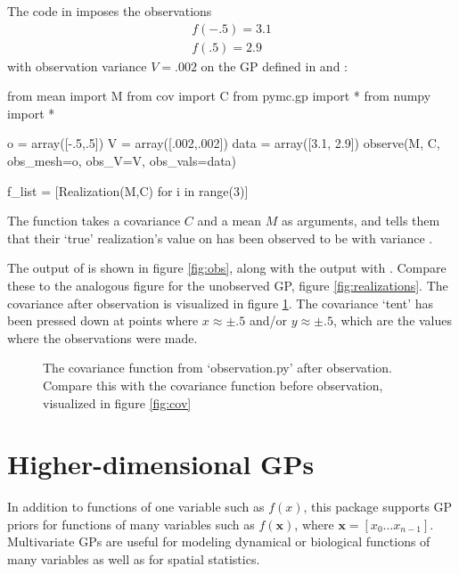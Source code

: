 \documentclass[article]{jss}
\begin{document}
The code in  imposes the observations
\begin{eqnarray*}
    f(-.5) = 3.1\\
    f(.5) = 2.9
\end{eqnarray*}
with observation variance $V=.002$ on the GP defined in  and :
\begin{CodeChunk}
\begin{CodeInput}
from mean import M
from cov import C
from pymc.gp import *
from numpy import *

o = array([-.5,.5])
V = array([.002,.002])
data = array([3.1, 2.9])
observe(M, C, obs_mesh=o, obs_V=V, obs_vals=data)

f_list = [Realization(M,C) for i in range(3)]
\end{CodeInput}
\end{CodeChunk}

The function  takes a covariance $C$ and a mean $M$ as arguments, and tells them that their `true' realization's value on  has been observed to be  with variance . 

The output of   is shown in figure \ref{fig:obs}, along with the output with . Compare these to the analogous figure for the unobserved GP, figure \ref{fig:realizations}. The covariance after observation is visualized in figure \ref{fig:obscov}. The covariance `tent' has been pressed down at points where $x\approx \pm .5$ and/or $y\approx\pm .5$, which are the values where the observations were made.

\begin{figure}
    \centering
    \caption{The covariance function from {\sffamily `observation.py'} after observation. Compare this with the covariance function before observation, visualized in figure \ref{fig:cov} }
    \label{fig:obscov}
\end{figure}

\section{Higher-dimensional GPs}\label{sec:highdim}

In addition to functions of one variable such as $f(x)$, this package supports GP priors for functions of many variables such as $f(\mathbf{x})$, where $\mathbf{x}=[x_0\ldots x_{n-1}]$. Multivariate GPs are useful for modeling dynamical or biological functions of many variables as well as for spatial statistics.
\end{document}
